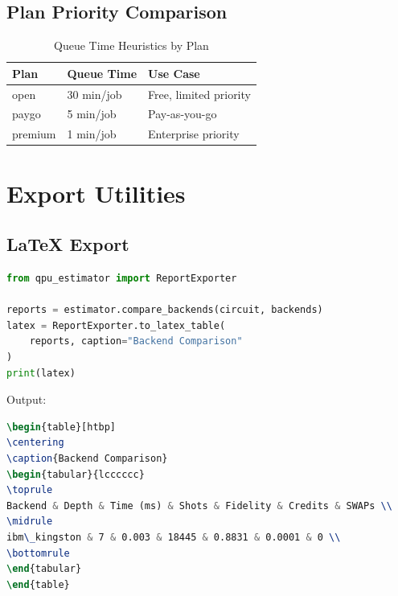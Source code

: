 \documentclass[11pt,a4paper]{article}
\begin{document}
\subsection{Plan Priority Comparison}

\begin{table}[htbp]
\centering
\caption{Queue Time Heuristics by Plan}
\begin{tabular}{@{}lll@{}}
\toprule
\textbf{Plan} & \textbf{Queue Time} & \textbf{Use Case} \\
\midrule
open & 30 min/job & Free, limited priority \\
paygo & 5 min/job & Pay-as-you-go \\
premium & 1 min/job & Enterprise priority \\
\bottomrule
\end{tabular}
\end{table}

\section{Export Utilities}

\subsection{LaTeX Export}

\begin{lstlisting}[language=Python,caption=LaTeX Table Export]
from qpu_estimator import ReportExporter

reports = estimator.compare_backends(circuit, backends)
latex = ReportExporter.to_latex_table(
    reports, caption="Backend Comparison"
)
print(latex)
\end{lstlisting}

Output:
\begin{lstlisting}[language=TeX,caption=Generated LaTeX]
\begin{table}[htbp]
\centering
\caption{Backend Comparison}
\begin{tabular}{lcccccc}
\toprule
Backend & Depth & Time (ms) & Shots & Fidelity & Credits & SWAPs \\
\midrule
ibm\_kingston & 7 & 0.003 & 18445 & 0.8831 & 0.0001 & 0 \\
\bottomrule
\end{tabular}
\end{table}
\end{lstlisting}
\end{document}
